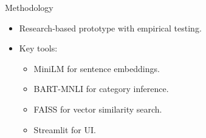 
\begin{frame}{Methodology}
\begin{itemize}
  \item Research-based prototype with empirical testing.
  \item Key tools:
    \begin{itemize}
      \item MiniLM for sentence embeddings.
      \item BART-MNLI for category inference.
      \item FAISS for vector similarity search.
      \item Streamlit for UI.
    \end{itemize}
\end{itemize}
\end{frame}
